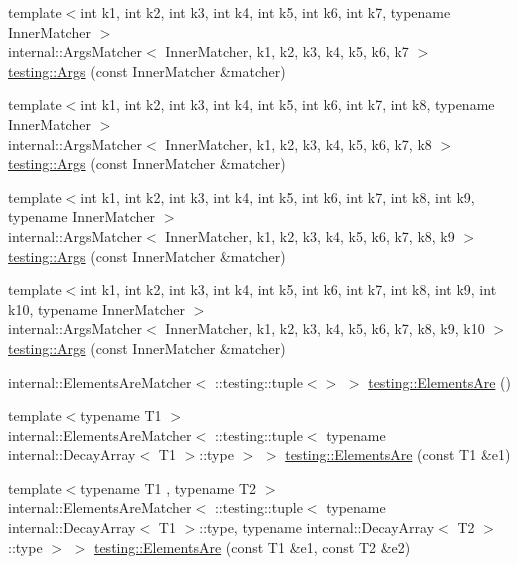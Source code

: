 \begin{DoxyCompactItemize}
\item 
{\footnotesize template$<$int k1, int k2, int k3, int k4, int k5, int k6, int k7, typename Inner\+Matcher $>$ }\\internal\+::\+Args\+Matcher$<$ Inner\+Matcher, k1, k2, k3, k4, k5, k6, k7 $>$ \hyperlink{namespacetesting_a9a9ef7a866b397430527076e342817f9}{testing\+::\+Args} (const Inner\+Matcher \&matcher)
\item 
{\footnotesize template$<$int k1, int k2, int k3, int k4, int k5, int k6, int k7, int k8, typename Inner\+Matcher $>$ }\\internal\+::\+Args\+Matcher$<$ Inner\+Matcher, k1, k2, k3, k4, k5, k6, k7, k8 $>$ \hyperlink{namespacetesting_ae8a4e8e1b8eb87c9f1e5f02519da7fce}{testing\+::\+Args} (const Inner\+Matcher \&matcher)
\item 
{\footnotesize template$<$int k1, int k2, int k3, int k4, int k5, int k6, int k7, int k8, int k9, typename Inner\+Matcher $>$ }\\internal\+::\+Args\+Matcher$<$ Inner\+Matcher, k1, k2, k3, k4, k5, k6, k7, k8, k9 $>$ \hyperlink{namespacetesting_a62c877e01fb9098cd3c399f921bf4e3e}{testing\+::\+Args} (const Inner\+Matcher \&matcher)
\item 
{\footnotesize template$<$int k1, int k2, int k3, int k4, int k5, int k6, int k7, int k8, int k9, int k10, typename Inner\+Matcher $>$ }\\internal\+::\+Args\+Matcher$<$ Inner\+Matcher, k1, k2, k3, k4, k5, k6, k7, k8, k9, k10 $>$ \hyperlink{namespacetesting_a09ac462e8d6ed468cbfaa9c767aee0aa}{testing\+::\+Args} (const Inner\+Matcher \&matcher)
\item 
internal\+::\+Elements\+Are\+Matcher$<$ \+::testing\+::tuple$<$$>$ $>$ \hyperlink{namespacetesting_a79cf4ae694bf8231dcf283b325405f27}{testing\+::\+Elements\+Are} ()
\item 
{\footnotesize template$<$typename T1 $>$ }\\internal\+::\+Elements\+Are\+Matcher$<$ \+::testing\+::tuple$<$ typename internal\+::\+Decay\+Array$<$ T1 $>$\+::type $>$ $>$ \hyperlink{namespacetesting_aa35aa6c9638d989e9f4aaa6009f60589}{testing\+::\+Elements\+Are} (const T1 \&e1)
\item 
{\footnotesize template$<$typename T1 , typename T2 $>$ }\\internal\+::\+Elements\+Are\+Matcher$<$ \+::testing\+::tuple$<$ typename internal\+::\+Decay\+Array$<$ T1 $>$\+::type, typename internal\+::\+Decay\+Array$<$ T2 $>$\+::type $>$ $>$ \hyperlink{namespacetesting_a864f77fe7774308d4c54f1f52f9040cf}{testing\+::\+Elements\+Are} (const T1 \&e1, const T2 \&e2)
$$
\end{DoxyCompactItemize}
